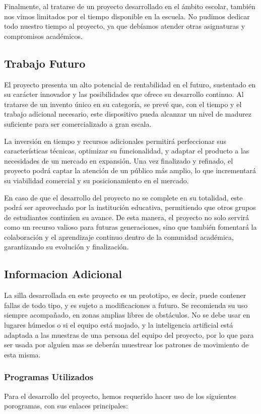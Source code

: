 \documentclass{article}
\begin{document}
Finalmente, al tratarse de un proyecto desarrollado en el ámbito escolar, también nos vimos limitados por el tiempo disponible en la escuela. No pudimos dedicar todo nuestro tiempo al proyecto, ya que debíamos atender otras asignaturas y compromisos académicos.

\subsection{Trabajo Futuro}
El proyecto presenta un alto potencial de rentabilidad en el futuro, sustentado en su carácter innovador y las posibilidades que ofrece su desarrollo continuo. Al tratarse de un invento único en su categoría, se prevé que, con el tiempo y el trabajo adicional necesario, este dispositivo pueda alcanzar un nivel de madurez suficiente para ser comercializado a gran escala.

La inversión en tiempo y recursos adicionales permitirá perfeccionar sus características técnicas, optimizar su funcionalidad, y adaptar el producto a las necesidades de un mercado en expansión. Una vez finalizado y refinado, el proyecto podrá captar la atención de un público más amplio, lo que incrementará su viabilidad comercial y su posicionamiento en el mercado.

En caso de que el desarrollo del proyecto no se complete en su totalidad, este podrá ser aprovechado por la institución educativa, permitiendo que otros grupos de estudiantes continúen su avance. De esta manera, el proyecto no solo servirá como un recurso valioso para futuras generaciones, sino que también fomentará la colaboración y el aprendizaje continuo dentro de la comunidad académica, garantizando su evolución y finalización.
\subsection {Informacion Adicional}
La silla desarrollada en este proyecto es un prototipo, es decir, puede contener fallas de todo tipo, y es sujeto a modificaciones a futuro. Se recomienda su uso siempre acompañado, en zonas amplias libres de obstáculos. No se debe usar en lugares húmedos o si el equipo está mojado, y la inteligencia artificial está adaptada a las muestras de una persona del equipo del proyecto, por lo que para ser usada por alguien mas se deberán muestrear los patrones de movimiento de esta misma.

\subsubsection{Programas Utilizados}
Para el desarrollo del proyecto, hemos requerido hacer uso de los siguientes porogramas, con sus enlaces principales: \newline
\end{document}
